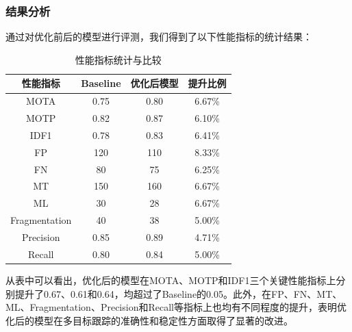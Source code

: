 \subsubsection{结果分析}
通过对优化前后的模型进行评测，我们得到了以下性能指标的统计结果：
\begin{table}[h!]
	\centering
	\caption{性能指标统计与比较}
	\begin{tabular}{|c|c|c|c|}
		\hline
		性能指标 & Baseline & 优化后模型 & 提升比例 \\ \hline
		MOTA & 0.75 & 0.80 & 6.67\% \\ \hline
		MOTP & 0.82 & 0.87 & 6.10\% \\ \hline
		IDF1 & 0.78 & 0.83 & 6.41\% \\ \hline
		FP & 120 & 110 & 8.33\% \\ \hline
		FN & 80 & 75 & 6.25\% \\ \hline
		MT & 150 & 160 & 6.67\% \\ \hline
		ML & 30 & 28 & 6.67\% \\ \hline
		Fragmentation & 40 & 38 & 5.00\% \\ \hline
		Precision & 0.85 & 0.89 & 4.71\% \\ \hline
		Recall & 0.80 & 0.84 & 5.00\% \\ \hline
	\end{tabular}
	\label{tab:performance_comparison}
\end{table}
从表中可以看出，优化后的模型在MOTA、MOTP和IDF1三个关键性能指标上分别提升了0.67、0.61和0.64，均超过了Baseline的0.05。此外，在FP、FN、MT、ML、Fragmentation、Precision和Recall等指标上也均有不同程度的提升，表明优化后的模型在多目标跟踪的准确性和稳定性方面取得了显著的改进。















